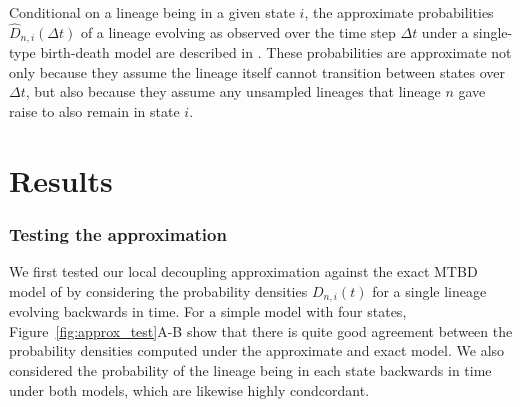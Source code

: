 \documentclass[10pt]{article}
\begin{document}
Conditional on a lineage being in a given state $i$, the approximate probabilities $\hat{D}_{n,i}(\Delta t)$ of a lineage evolving as observed over the time step $\Delta t$ under a single-type birth-death model are described in \citet{barido2018detection}. These probabilities are approximate not only because they assume the lineage itself cannot transition between states over $\Delta t$, but also because they assume any unsampled lineages that lineage $n$ gave raise to also remain in state $i$. 





\section*{Results}

\subsubsection*{Testing the approximation}

We first tested our local decoupling approximation against the exact MTBD model of \citet{stadler2013uncovering} by considering the probability densities $D_{n,i}(t)$ for a single lineage evolving backwards in time. For a simple model with four states, Figure~\ref{fig:approx_test}A-B show that there is quite good agreement between the probability densities computed under the approximate and exact model. We also considered the probability of the lineage being in each state backwards in time under both models, which are likewise highly condcordant.
\end{document}
